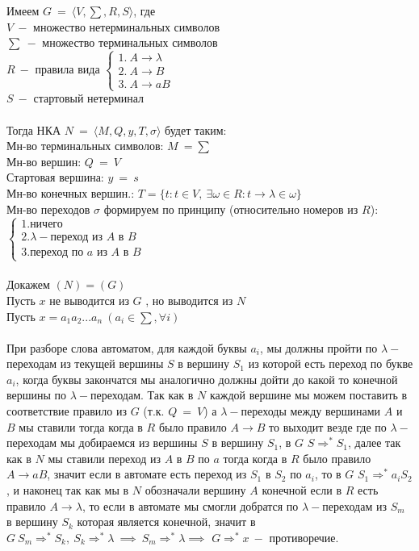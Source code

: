 \documentclass[10pt]{article}
\begin{document}
{\begin{enumerate}
{		}
		Имеем $G\ =\ \langle V,\sum,R,S\rangle$, где\\
		$V\ -$ множество нетерминальных символов\\
		$\sum\ -$ множество терминальных символов\\
		$R\ -$ правила вида $\begin{cases}1.\ A\rightarrow\lambda\\ 2.\ A\rightarrow B\\ 3.\ A\rightarrow aB \end{cases}$\\
		$S\ -$ стартовый нетерминал\\\\
		Тогда НКА $N\ =\ \langle M,Q,y,T,\sigma\rangle$ будет таким:\\
		Мн-во терминальных символов: $M\ = \sum$\\
		Мн-во вершин: $Q\ =\ V$\\
		Стартовая вершина: $y\ =\ s$\\
		Мн-во конечных вершин.: $T=\{t:t\in V,\ \exists\omega\in R: t\rightarrow\lambda\in\omega\}$ \\
		Мн-во переходов $\sigma$ формируем по принципу (относительно номеров из $R$): $\begin{cases}1.\text{ничего}\\ 2.\lambda-\text{переход из }A \text{ в } B\\ 3.\text{переход по } a \text{ из }A \text{ в }B \end{cases}$\\\\
		Докажем $(N)=(G)$\\
		Пусть $x$ не выводится из $G$ , но выводится из $N$\\
		Пусть $x=a_1a_2...a_n\ (a_i \in \sum, \forall i)$\\\\
		При разборе слова автоматом, для каждой буквы $a_i$, мы должны пройти по $\lambda-$переходам из текущей вершины $S$ в вершину $S_1$ из которой есть переход по букве $a_i$, когда буквы закончатся мы аналогично должны дойти до какой то конечной вершины по $\lambda-$переходам.
		Так как в $N$ каждой вершине мы можем поставить в соответствие правило из $G$ (т.к. $Q\ =\ V$) а $\lambda-$переходы между вершинами $A$ и $B$ мы ставили тогда когда в $R$ было правило $A\rightarrow B$ то 
		выходит везде где по $\lambda-$переходам мы добираемся из вершины $S$ в вершину $S_1$, в $G$ $S\Rightarrow^* S_1$, далее так как в $N$ мы ставили переход из $A$ в $B$ по $a$ тогда когда в $R$ было правило $A\rightarrow aB$, значит если в автомате есть переход из $S_1$ в $S_2$ по $a_i$, то в $G$ $S_1\Rightarrow^* a_iS_2$, и наконец так как мы в $N$ обозначали вершину $A$ конечной если в $R$ есть правило $A\rightarrow\lambda$, то если в автомате мы смогли добратся по $\lambda-$переходам из $S_m$ в вершину $S_k$ которая является конечной, значит в $G\ S_m\Rightarrow^* S_k,\ S_k\Rightarrow^* \lambda\ \implies\ S_m\Rightarrow^* \lambda \implies$ $G\Rightarrow^*x\ -$ противоречие.\\\\

\end{enumerate}}
\end{document}
